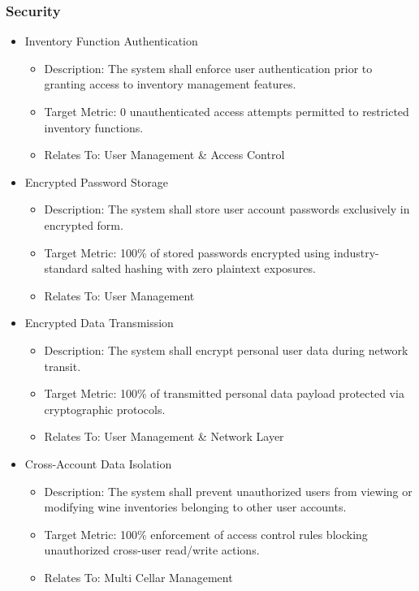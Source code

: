 \documentclass[conference]{IEEEtran}
\begin{document}
\subsubsection{Security}
\begin{itemize}
    \item Inventory Function Authentication
    \begin{itemize}
        \item Description: The system shall enforce user authentication prior to granting access to inventory management features.
        \item Target Metric: 0 unauthenticated access attempts permitted to restricted inventory functions.
        \item Relates To: User Management \& Access Control
    \end{itemize}

    \item Encrypted Password Storage
    \begin{itemize}
        \item Description: The system shall store user account passwords exclusively in encrypted form.
        \item Target Metric: 100\% of stored passwords encrypted using industry-standard salted hashing with zero plaintext exposures.
        \item Relates To: User Management
    \end{itemize}

    \item Encrypted Data Transmission
    \begin{itemize}
        \item Description: The system shall encrypt personal user data during network transit.
        \item Target Metric: 100\% of transmitted personal data payload protected via cryptographic protocols.
        \item Relates To: User Management \& Network Layer
    \end{itemize}

    \item Cross-Account Data Isolation
    \begin{itemize}
        \item Description: The system shall prevent unauthorized users from viewing or modifying wine inventories belonging to other user accounts.
        \item Target Metric: 100\% enforcement of access control rules blocking unauthorized cross-user read/write actions.
        \item Relates To: Multi Cellar Management
    \end{itemize}


\end{itemize}
\end{document}
